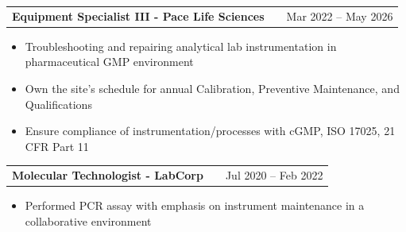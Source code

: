 \documentclass[letter,12pt]{article}
\makeatletter
\newenvironment{joblong}[2]
    {
    \begin{tabularx}{\linewidth}{@{}l X r@{}}
    \textbf{#1} & \hfill &  #2 \\[3.75pt]
    \end{tabularx}
    \begin{minipage}[t]{\linewidth}
    \begin{itemize}[leftmargin=1em, label=--]
    }
    {
    \end{itemize}
    \end{minipage}    
    }
\makeatother
\begin{document}
\begin{joblong}{Equipment Specialist III - Pace Life Sciences}{Mar 2022 -- May 2026}

    \item Troubleshooting and repairing analytical lab instrumentation in pharmaceutical GMP environment
    \item Own the site's schedule for annual Calibration, Preventive Maintenance, and Qualifications
    \item Ensure compliance of instrumentation/processes with cGMP, ISO 17025, 21 CFR Part 11

\end{joblong}


\begin{joblong}{Molecular Technologist - LabCorp}{Jul 2020 -- Feb 2022}
\item Performed PCR assay with emphasis on instrument maintenance in a collaborative environment
\end{joblong}


\end{document}
